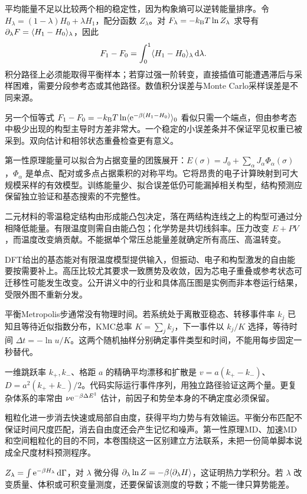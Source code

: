 平均能量不足以比较两个相的稳定性，因为构象熵可以逆转能量排序。令 $H_\lambda=(1-\lambda)H_0+\lambda H_1$，配分函数 $Z_\lambda$。对 $F_\lambda=-k_{\mathrm B} T\ln Z_\lambda$ 求导有 $\partial_\lambda F=\langle H_1-H_0\rangle_\lambda$，因此
\[
F_1-F_0=\int_0^1\langle H_1-H_0\rangle_\lambda\,\mathrm d\lambda.
\]
积分路径上必须能取得平衡样本；若穿过强一阶转变，直接插值可能遭遇滞后与采样困难，需要分段参考态或其他路径。数值积分误差与Monte Carlo采样误差是不同来源。

另一个恒等式 $F_1-F_0=-k_{\mathrm B} T\ln\langle \mathrm e^{-\beta(H_1-H_0)}\rangle_0$ 看似只需一个端点，但由参考态中极少出现的构型主导时方差非常大。一个稳定的小误差条并不保证罕见权重已被采到。双向估计和相邻状态重叠检查更有意义。

第一性原理能量可以拟合为占据变量的团簇展开：$E(\sigma)=J_0+\sum_\alpha J_\alpha\Phi_\alpha(\sigma)$，$\Phi_\alpha$ 是单点、配对或多点占据乘积的对称平均。它将昂贵的电子计算映射到可大规模采样的有效模型。训练能量少、拟合误差低仍可能漏掉相关构型，结构预测应保留独立验证和基态搜索的不完整性。

二元材料的零温稳定结构由形成能凸包决定，落在两结构连线之上的构型可通过分相降低能量。有限温度则需自由能凸包；化学势是共切线斜率。压力改变 $E+PV$，而温度改变熵贡献。不能据单个常压总能量差就确定所有高压、高温转变。

DFT给出的基态能对有限温度模型提供输入，但振动、电子和构型激发的自由能要按需要补上。高压比较尤其要求一致赝势及收敛，因为芯电子重叠或参考状态可迁移性可能发生改变。公开讲义中的行业和具体高压图是实例而非本卷运行结果，受限外图不重新分发。

平衡Metropolis步通常没有物理时间。若系统处于离散亚稳态、转移事件率 $k_j$ 已知且等待近似指数分布，KMC总率 $K=\sum_jk_j$，下一事件以 $k_j/K$ 选择，等待时间 $\Delta t=-\ln u/K$。这两个随机抽样分别确定事件类型和时间，不能用每步固定一秒替代。

一维跳跃率 $k_+,k_-$、格距 $a$ 的精确平均漂移和扩散是 $v=a(k_+-k_-)$、$D=a^2(k_++k_-)/2$。代码实际运行事件序列，用独立路径验证这两个量。更复杂体系的率常由 $\nu\mathrm e^{-\beta\Delta E^\ddagger}$ 估计，前因子和势垒本身的不确定度必须保留。

粗粒化进一步消去快速或局部自由度，获得平均力势与有效输运。平衡分布匹配不保证时间尺度匹配，消去自由度还会产生记忆和噪声。第一性原理MD、加速MD和空间粗粒化的目的不同，本卷围绕这一区别建立方法联系，未把一份简单脚本说成全尺度材料预测程序。

$Z_\lambda=\int\mathrm e^{-\beta H_\lambda}\,\mathrm d\Gamma$，对 $\lambda$ 微分得 $\partial_\lambda\ln Z=-\beta\langle \partial_\lambda H\rangle$，这证明热力学积分。若 $\lambda$ 改变质量、体积或可积变量测度，还要保留该测度的导数；不能一律只算势能差。

